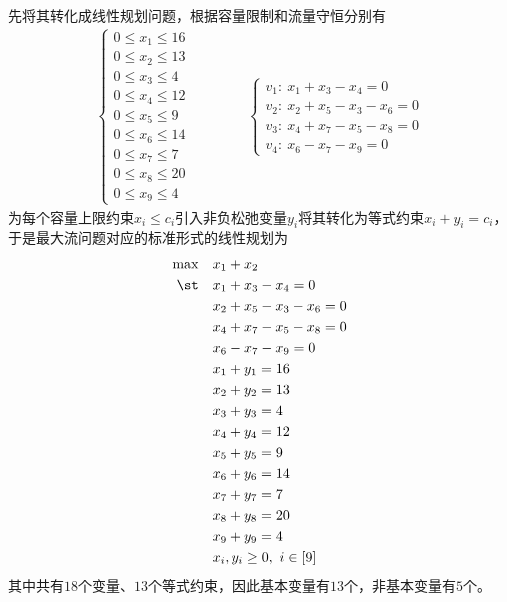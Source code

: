 \documentclass{ctexart}
\begin{document}
先将其转化成线性规划问题，根据容量限制和流量守恒分别有
\begin{align*}
    \begin{cases}
        0 \le x_1 \le 16 \\
        0 \le x_2 \le 13 \\
        0 \le x_3 \le 4  \\
        0 \le x_4 \le 12 \\
        0 \le x_5 \le 9  \\
        0 \le x_6 \le 14 \\
        0 \le x_7 \le 7  \\
        0 \le x_8 \le 20 \\
        0 \le x_9 \le 4
    \end{cases} \qquad \qquad
    \begin{cases}
        v_1: ~ x_1 + x_3 - x_4 = 0       \\
        v_2: ~ x_2 + x_5 - x_3 - x_6 = 0 \\
        v_3: ~ x_4 + x_7 - x_5 - x_8 = 0 \\
        v_4: ~ x_6 - x_7 - x_9 = 0
    \end{cases}
\end{align*}
为每个容量上限约束$x_i \le c_i$引入非负松弛变量$y_i$将其转化为等式约束$x_i + y_i = c_i$，于是最大流问题对应的标准形式的线性规划为
\begin{align*}
    \max \quad & x_1 + x_2                   \\
    \st \quad  & x_1 + x_3 - x_4 = 0         \\
               & x_2 + x_5 - x_3 - x_6 = 0   \\
               & x_4 + x_7 - x_5 - x_8 = 0   \\
               & x_6 - x_7 - x_9 = 0         \\
               & x_1 + y_1 = 16              \\
               & x_2 + y_2 = 13              \\
               & x_3 + y_3 = 4               \\
               & x_4 + y_4 = 12              \\
               & x_5 + y_5 = 9               \\
               & x_6 + y_6 = 14              \\
               & x_7 + y_7 = 7               \\
               & x_8 + y_8 = 20              \\
               & x_9 + y_9 = 4               \\
               & x_i, y_i \ge 0, ~ i \in [9]
\end{align*}
其中共有$18$个变量、$13$个等式约束，因此基本变量有$13$个，非基本变量有$5$个。
\end{document}
